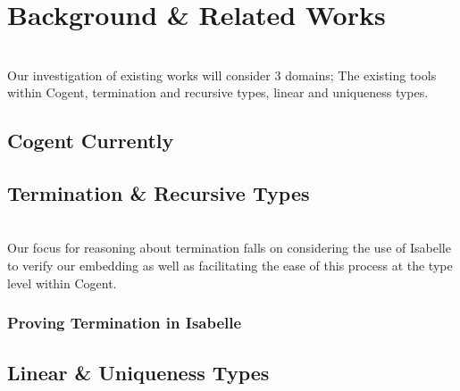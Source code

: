 \chapter{Background \& Related Works}\label{ch:background}
\\
Our investigation of existing works will consider 3 domains; The existing tools within Cogent,
termination and recursive types,  linear and uniqueness types.

\section{Cogent Currently}

\section{Termination \& Recursive Types}
\\
Our focus for reasoning about termination falls on considering the use of Isabelle to verify our 
embedding as well as facilitating the ease of this process at the type level within Cogent. 
\subsection{Proving Termination in Isabelle}


\section{Linear \& Uniqueness Types}
